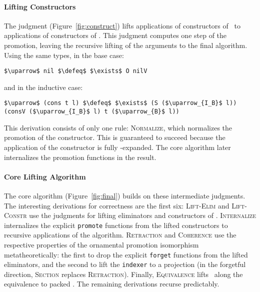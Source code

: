 \paragraph{Lifting Constructors}
The  judgment (Figure~\ref{fig:construct}) lifts applications of constructors of \Aa\ to applications of constructors of \B. 
This judgment computes one step of the promotion, leaving the recursive lifting of the arguments to the final algorithm. Using the same types, 
in the base case:
\begin{lstlisting}
$\uparrow$ nil $\defeq$ $\exists$ O nilV
\end{lstlisting}
and in the inductive case:
\begin{lstlisting}
$\uparrow$ (cons t l) $\defeq$ $\exists$ (S ($\uparrow_{I_B}$ l)) (consV ($\uparrow_{I_B}$ l) t ($\uparrow_{B}$ l))
\end{lstlisting}
This derivation consists of only one rule: 
\textsc{Normalize}, which normalizes the promotion of the constructor.
This is guaranteed to succeed because the application of the constructor is fully \smallmath{$\eta$}-expanded.
The core algorithm later internalizes the promotion functions in the result.

\paragraph{Core Lifting Algorithm}
The core algorithm (Figure~\ref{fig:final}) builds on these intermediate judgments.
The interesting derivations for correctness are the first six:
\textsc{Lift-Elim} and \textsc{Lift-Constr} use the judgments for lifting eliminators and constructors of \Aa.
\textsc{Internalize} internalizes the explicit \lstinline{promote} functions from the lifted constructors to recursive applications of the algorithm.
\textsc{Retraction} and \textsc{Coherence} use the respective properties of the ornamental promotion isomorphism metatheoretically:
the first to drop the explicit \lstinline{forget} functions from the lifted eliminators, and the second 
to lift the \lstinline{indexer} to a projection (in the forgetful direction, \textsc{Section} replaces \textsc{Retraction}).
Finally, \textsc{Equivalence} lifts \Aa\ along the equivalence to packed \B.
The remaining derivations recurse predictably.

